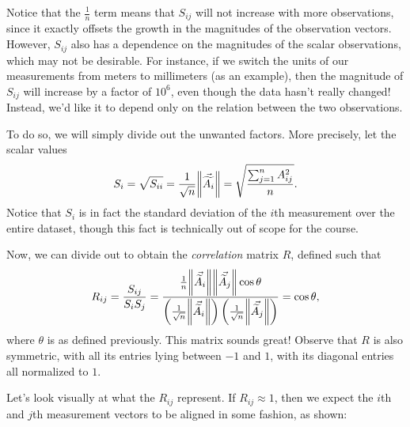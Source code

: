 \documentclass[letterpaper]{article}
\theoremstyle{remark}
\renewcommand{\tilde}[1]{\widetilde{#1}}
\begin{document}
Notice that the $\frac{1}{n}$ term means that $S_{ij}$ will not increase with more observations, since it exactly offsets the growth in the magnitudes of the observation vectors. However, $S_{ij}$ also has a dependence on the magnitudes of the scalar observations, which may not be desirable. For instance, if we switch the units of our measurements from meters to millimeters (as an example), then the magnitude of $S_{ij}$ will increase by a factor of $10^6$, even though the data hasn't really changed! Instead, we'd like it to depend only on the relation between the two observations. 

To do so, we will simply divide out the unwanted factors. More precisely, let the scalar values
\[
    S_i = \sqrt{S_{ii}} = \frac{1}{\sqrt{n}}\norm{\vec{\tilde{A_i}}} = \sqrt{\frac{\sum_{j=1}^nA_{ij}^2}{n}}.
\]
Notice that $S_i$ is in fact the standard deviation of the $i$th measurement over the entire dataset, though this fact is technically out of scope for the course.

Now, we can divide out to obtain the \emph{correlation} matrix $R$, defined such that
\[
    R_{ij} = \frac{S_{ij}}{S_iS_j} = \frac{\frac{1}{n}\norm{\vec{\tilde{A}_i}}\norm{\vec{\tilde{A}_j}}\cos{\theta}}{\left(\frac{1}{\sqrt{n}}\norm{\vec{\tilde{A}_i}}\right)\left(\frac{1}{\sqrt{n}}\norm{\vec{\tilde{A}_j}}\right)} = \cos{\theta},
\]
where $\theta$ is as defined previously. This matrix sounds great! Observe that $R$ is also symmetric, with all its entries lying between $-1$ and $1$, with its diagonal entries all normalized to $1$. 

Let's look visually at what the $R_{ij}$ represent. If $R_{ij} \approx 1$, then we expect the $i$th and $j$th measurement vectors to be aligned in some fashion, as shown:
\begin{center}
\end{center}
\end{document}
